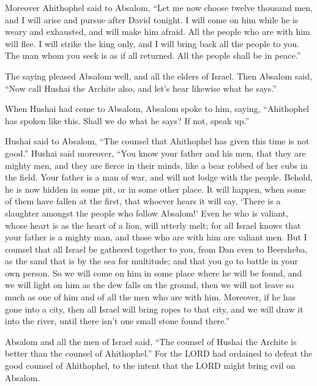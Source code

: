  Moreover Ahithophel said to Absalom, ``Let me now choose
twelve thousand men, and I will arise and pursue after David tonight.
 I will come on him while he is weary and exhausted, and
will make him afraid. All the people who are with him will flee. I will
strike the king only,  and I will bring back all the
people to you. The man whom you seek is as if all returned. All the
people shall be in peace.''

 The saying pleased Absalom well, and all the elders of
Israel.  Then Absalom said, ``Now call Hushai the Archite
also, and let's hear likewise what he says.''

 When Hushai had come to Absalom, Absalom spoke to him,
saying, ``Ahithophel has spoken like this. Shall we do what he says? If
not, speak up.''

 Hushai said to Absalom, ``The counsel that Ahithophel has
given this time is not good.''  Hushai said moreover,
``You know your father and his men, that they are mighty men, and they
are fierce in their minds, like a bear robbed of her cubs in the field.
Your father is a man of war, and will not lodge with the people.
 Behold, he is now hidden in some pit, or in some other
place. It will happen, when some of them have fallen at the first, that
whoever hears it will say, `There is a slaughter amongst the people who
follow Absalom!'  Even he who is valiant, whose heart is
as the heart of a lion, will utterly melt; for all Israel knows that
your father is a mighty man, and those who are with him are valiant men.
 But I counsel that all Israel be gathered together to
you, from Dan even to Beersheba, as the sand that is by the sea for
multitude; and that you go to battle in your own person. 
So we will come on him in some place where he will be found, and we will
light on him as the dew falls on the ground, then we will not leave so
much as one of him and of all the men who are with him. 
Moreover, if he has gone into a city, then all Israel will bring ropes
to that city, and we will draw it into the river, until there isn't one
small stone found there.''

 Absalom and all the men of Israel said, ``The counsel of
Hushai the Archite is better than the counsel of Ahithophel.'' For the
LORD had ordained to defeat the good counsel of Ahithophel, to the
intent that the LORD might bring evil on Absalom.

